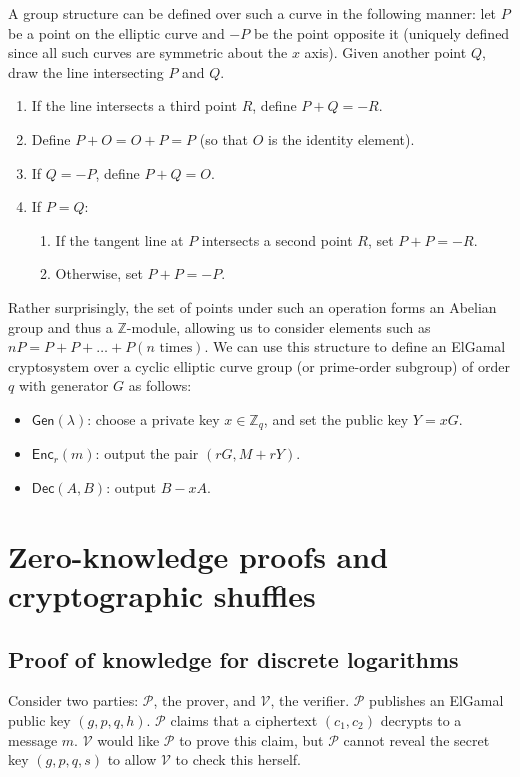 \documentclass[12pt,a4paper]{article}
\theoremstyle{definition}
\begin{document}
A group structure can be defined over such a curve in the following manner: let $P$ be a point on the elliptic curve and $-P$ be the point opposite it (uniquely defined since all such curves are symmetric about the $x$ axis). Given another point $Q$, draw the line intersecting $P$ and $Q$.
\begin{enumerate}
    \item If the line intersects a third point $R$, define $P + Q = -R$.
    \item Define $P + O = O + P = P$ (so that $O$ is the identity element).
    \item If $Q = -P$, define $P + Q = O$.
    \item If $P = Q$:
    \begin{enumerate}
        \item If the tangent line at $P$ intersects a second point $R$, set $P + P = -R$.
        \item Otherwise, set $P + P = -P$.
    \end{enumerate}
\end{enumerate}
Rather surprisingly, the set of points under such an operation forms an Abelian group and thus a $\mathbb{Z}$-module, allowing us to consider elements such as $nP = P + P + \ldots + P (n \text{ times})$. We can use this structure to define an ElGamal cryptosystem over a cyclic elliptic curve group (or prime-order subgroup) of order $q$ with generator $G$ as follows:
\begin{itemize}
    \item $\mathsf{Gen}(\lambda)$: choose a private key $x\in\mathbb{Z}_q$, and set the public key $Y = xG$.
    \item $\mathsf{Enc}_r(m)$: output the pair $(rG, M + rY)$.
    \item $\mathsf{Dec}(A, B)$: output $B - xA$.
\end{itemize}
\newpage
\section{Zero-knowledge proofs and cryptographic shuffles}\label{app-proof}
\subsection{Proof of knowledge for discrete logarithms}
Consider two parties: $\mathcal{P}$, the prover, and $\mathcal{V}$, the verifier. $\mathcal{P}$ publishes an ElGamal public key $(g,p,q,h)$. $\mathcal{P}$ claims that a ciphertext $(c_1, c_2)$ decrypts to a message $m$. $\mathcal{V}$ would like $\mathcal{P}$ to prove this claim, but $\mathcal{P}$ cannot reveal the secret key $(g,p,q,s)$ to allow $\mathcal{V}$ to check this herself.
\end{document}
